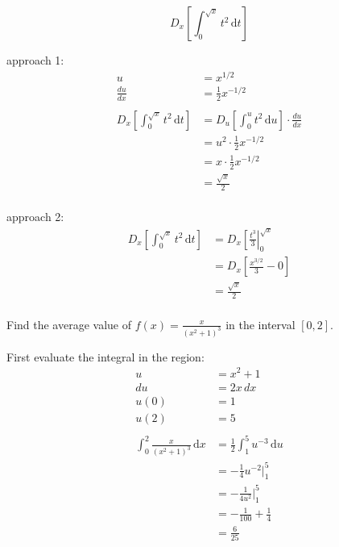 \documentclass[fleqn,addpoints]{exam}
\begin{document}
\begin{questions}
\question[10]
\[
  D_x \left[ \int_{0}^{\sqrt{x}} t^2 \, \mathrm{d}t \right]
\]
\begin{solution}[8 cm]

approach 1:
\begin{align*}
  u &= x^{1/2} \\
  \frac{du}{dx} &= \frac{1}{2} x^{-1/2} \\
\\
  D_x \left[ \int_{0}^{\sqrt{x}} t^2 \, \mathrm{d}t \right] &= D_u \left[ \int_0^u t^2 \, \mathrm{d}u \right] \cdot \frac{du}{dx} \\
  &= u^2 \cdot \frac{1}{2} x^{-1/2} \\
  &= x \cdot \frac{1}{2} x^{-1/2} \\
  &= \frac{\sqrt{x}}{2} \\
\end{align*}

approach 2:
\begin{align*}
  D_x \left[ \int_{0}^{\sqrt{x}} t^2 \, \mathrm{d}t \right] &= D_x \left[ \frac{t^3}{3} \right|_{0}^{\sqrt{x}} \\
  &= D_x \left[ \frac{x^{3/2}}{3} - 0 \right] \\
  &= \frac{\sqrt{x}}{2} \\
\end{align*}

\end{solution}

\ifprintanswers
\pagebreak
\fi

\question[10]
Find the average value of $f(x) = \frac{x}{(x^2 + 1)^3}$ in the interval $[0, 2]$.

\begin{solution}[5 cm]
First evaluate the integral in the region:
\begin{align*}
  u &= x^2 + 1 \\
  du &= 2x \, dx \\
  u(0) &= 1 \\
  u(2) &= 5 \\
\\
  \int_0^2 \frac{x}{(x^2 + 1)^3} \, \mathrm{d}x &= \frac{1}{2} \int_1^5 u^{-3} \, \mathrm{d}u \\
  &= - \frac{1}{4} u^{-2} \bigg|_1^5 \\
  &= - \frac{1}{4u^2} \bigg|_1^5 \\
  &= - \frac{1}{100} + \frac{1}{4} \\
  &= \frac{6}{25}\\
\end{align*}


\end{solution}
\end{questions}
\end{document}
